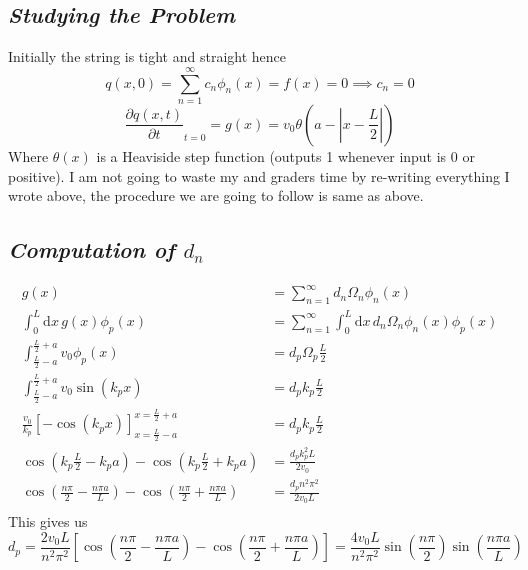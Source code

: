\documentclass[letter]{article}
\begin{document}
\subsection*{\emph{Studying the Problem}}
Initially the string is tight and straight hence 
\[
q(x, 0) = \sum_{n=1}^{\infty} c_n \phi_n(x) = f(x) = 0 \implies \boxed{
c_n = 0
}
\] 
\[
	\frac{\partial q(x,t)}{\partial t} _{t = 0} = g(x) = v_0 \theta\left(a - \left|x - \frac{L}{2} \right|\right)
\]
Where $\theta(x)$ is a Heaviside step function (outputs 1 whenever input is 0 or positive).
I am not going to waste my and graders time by re-writing everything I wrote above, the procedure we are going to follow is same as above. 

\subsection*{\emph{Computation of $d_n$ }}
\begin{align*}
	g(x) &= \sum_{n=1}^{\infty} d_n \Omega_n \phi_n(x)   \\
\int_{0}^{L} \mathrm{d} x\, 	g(x) \phi_p (x) &= \sum_{n=1}^{\infty}  \int_{0}^{L} \mathrm{d} x \, d_n \Omega_n \phi_n (x) \phi_p (x)\\
\int_{\frac{L}{2} - a}^{\frac{L}{2} + a} v_0 \phi_p (x) &= d_p  \Omega_p \frac{L}{2} \\ 
\int_{\frac{L}{2}- a}^{\frac{L}{2} + a} v_0 \sin (k_p x) &= d_p  k_p \frac{L}{2}\\ 
\frac{v_0}{k_p} \left[ - \cos \left(k_p x\right)\right]_{x = \frac{L}{2} - a}^{x = \frac{L}{2}+a} &= d_p k_p \frac{L}{2} \\ 
\cos \left(k_p \frac{L}{2} - k_p a\right)- \cos \left( k_p \frac{L}{2} + k_p a\right)  &= \frac{d_p k_p^2 L}{2v_0} \\
\cos \left( \frac{n \pi }{2} - \frac{n \pi a}{L}\right) - 
\cos \left( \frac{n \pi }{2} + \frac{n \pi a}{L}\right) &= \frac{d_p n^2 \pi ^2 }{2 v_0 L} \\ 
\end{align*}
This gives us 
\[
d_p = \frac{2 v_0 L}{n^2 \pi ^2} 
\left[ 
\cos \left( \frac{n \pi }{2} - \frac{n \pi a}{L}\right) - 
\cos \left( \frac{n \pi }{2} + \frac{n \pi a}{L}\right) 
\right] 
= \frac{4 v_0 L}{n^2 \pi ^2} \sin \left(\frac{n \pi }{2}\right) \sin \left(\frac{n \pi a}{L}\right)
\]
\end{document}
